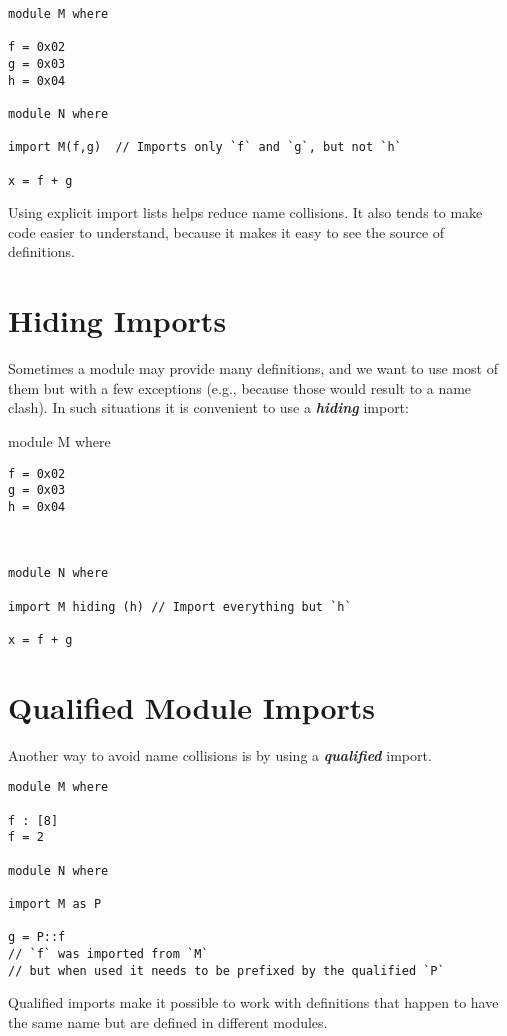 \begin{verbatim}
module M where

f = 0x02
g = 0x03
h = 0x04

module N where

import M(f,g)  // Imports only `f` and `g`, but not `h`

x = f + g
\end{verbatim}

Using explicit import lists helps reduce name collisions. It also tends
to make code easier to understand, because it makes it easy to see the
source of definitions.

\hypertarget{hiding-imports}{%
\section{Hiding Imports}\label{hiding-imports}}

Sometimes a module may provide many definitions, and we want to use most
of them but with a few exceptions (e.g., because those would result to a
name clash). In such situations it is convenient to use a
\textbf{\emph{hiding}} import:

module M where

\begin{verbatim}
f = 0x02
g = 0x03
h = 0x04



module N where

import M hiding (h) // Import everything but `h`

x = f + g
\end{verbatim}

\hypertarget{qualified-module-imports}{%
\section{Qualified Module Imports}\label{qualified-module-imports}}

Another way to avoid name collisions is by using a
\textbf{\emph{qualified}} import.

\begin{verbatim}
module M where

f : [8]
f = 2

module N where

import M as P

g = P::f
// `f` was imported from `M`
// but when used it needs to be prefixed by the qualified `P`
\end{verbatim}

Qualified imports make it possible to work with definitions that happen
to have the same name but are defined in different modules.

